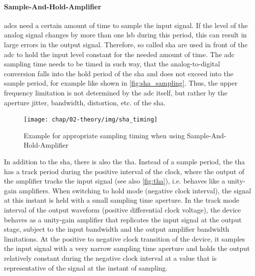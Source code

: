 \paragraph{Sample-And-Hold-Amplifier}
\Glspl{adc} need a certain amount of time to sample the input signal.
If the level of the analog signal changes by more than one \gls{lsb} during this period, this can result in large errors in the output signal.
Therefore, so called \gls{sha} are used in front of the \gls{adc} to hold the input level constant for the needed amount of time.
The \gls{adc} sampling time needs to be timed in such way, that the analog-to-digital conversion falls into the hold period of the \gls{sha} and does not exceed into the sample period, for example like shown in \autoref{fig:sha_sampling}. Thus, the upper frequency limitation is not determined by the \gls{adc} itself, but rather by the aperture jitter, bandwidth, distortion, etc. of the \gls{sha}. \cite{walt}

\begin{figure} [H]
	\centering
	\tikzexternaldisable
	\texttt{[image: chap/02-theory/img/sha\_timing]}  
	\caption[Sample-And-Hold Sampling Timing Diagram]{Example for appropriate sampling timing when using Sample-And-Hold-Amplifier}
	\label{fig:sha_timing}
	\tikzexternalenable
\end{figure}

In addition to the \gls{sha}, there is also the \gls{tha}.
Instead of a sample period, the \gls{tha} has a track period during the positive interval of the clock, where the output of the amplifier tracks the input signal (see also \autoref{fig:tha}), i.e. behaves like a unity-gain amplifiers. When switching to hold mode (negative clock interval), the signal at this instant is held with a small sampling time aperture. In the track mode interval of the output waveform (positive differential clock voltage), the device behaves as a unity-gain amplifier that replicates the input signal at the output stage, subject to the input bandwidth and the output amplifier bandwidth limitations. At the positive to negative clock transition of the device, it samples the input signal with a very narrow sampling time aperture and holds the output relatively constant during the negative clock interval at a value that is representative of the signal at the instant of sampling. \cite{Reeder2019}

